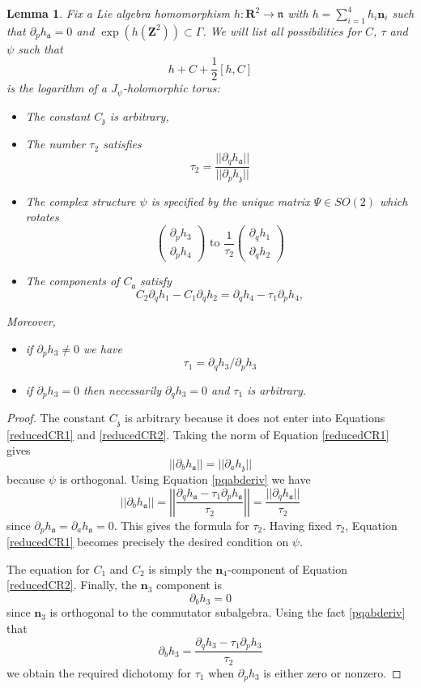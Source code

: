\documentclass[11pt]{amsart}
\newcommand{\RR}{\mathbf{R}}
\newcommand{\ZZ}{\mathbf{Z}}
\newcommand{\nn}{\mathfrak{n}}
\renewcommand{\aa}{\mathfrak{a}}
\newcommand{\zz}{\mathfrak{z}}
\numberwithin{equation}{section}
\newtheorem{lma}[equation]{Lemma}
\theoremstyle{definition}
\theoremstyle{remark}
\begin{document}
\begin{lma}\label{enum}
Fix a Lie algebra homomorphism $h\colon\RR^2\to\nn$ with $h=\sum_{i=1}^4h_i\mathbf{n}_i$ such that $\partial_ph_{\aa}=0$ and $\exp(h(\ZZ^2))\subset\Gamma$. We will list all possibilities for $C$, $\tau$ and $\psi$ such that
\[h+C+\frac{1}{2}[h,C]\]
is the logarithm of a $J_{\psi}$-holomorphic torus:
\begin{itemize}
\item The constant $C_{\zz}$ is arbitrary,
\item The number $\tau_2$ satisfies
\[\tau_2=\frac{||\partial_qh_{\aa}||}{||\partial_ph_{\zz}||}\]
\item The complex structure $\psi$ is specified by the unique matrix $\Psi\in SO(2)$ which rotates
\begin{equation}\label{psiequn}\left(\begin{array}{c}
\partial_ph_3\\
\partial_ph_4
\end{array}\right)\mbox{ to }\frac{1}{\tau_2}\left(\begin{array}{c}
\partial_qh_1\\
\partial_qh_2
\end{array}\right)\end{equation}
\item The components of $C_{\aa}$ satisfy
\begin{equation}\label{consteq}C_2\partial_qh_1-C_1\partial_qh_2=\partial_qh_4-\tau_1\partial_ph_4,\end{equation}
\end{itemize}
Moreover,
\begin{itemize}
\item if $\partial_ph_3\neq 0$ we have
\[\tau_1=\partial_qh_3/\partial_ph_3\]
\item if $\partial_ph_3=0$ then necessarily $\partial_qh_3=0$ and $\tau_1$ is arbitrary.
\end{itemize}
\end{lma}
\begin{proof}
The constant $C_{\zz}$ is arbitrary because it does not enter into Equations \eqref{reducedCR1} and \eqref{reducedCR2}. Taking the norm of Equation \eqref{reducedCR1} gives
\[||\partial_bh_{\aa}||=||\partial_ah_{\zz}||\]
because $\psi$ is orthogonal. Using Equation \eqref{pqabderiv} we have
\[||\partial_bh_{\aa}||=\left|\left|\frac{\partial_qh_{\aa}-\tau_1\partial_ph_{\aa}}{\tau_2}\right|\right|=\frac{||\partial_qh_{\aa}||}{\tau_2}\]
since $\partial_ph_{\aa}=\partial_ah_{\aa}=0$. This gives the formula for $\tau_2$. Having fixed $\tau_2$, Equation \eqref{reducedCR1} becomes precisely the desired condition on $\psi$.

The equation for $C_1$ and $C_2$ is simply the $\mathbf{n}_4$-component of Equation \eqref{reducedCR2}. Finally, the $\mathbf{n}_3$ component is
\[\partial_bh_3=0\]
since $\mathbf{n}_3$ is orthogonal to the commutator subalgebra. Using the fact \eqref{pqabderiv} that
\[\partial_bh_3=\frac{\partial_qh_3-\tau_1\partial_ph_3}{\tau_2}\]
we obtain the required dichotomy for $\tau_1$ when $\partial_ph_3$ is either zero or nonzero.
\end{proof}
\end{document}
